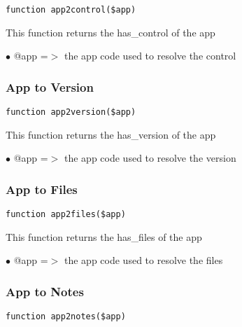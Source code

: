 \documentclass[a4paper]{article}
\begin{document}
\begin{lstlisting}
function app2control($app)
\end{lstlisting}

This function returns the has\_control of the app

\begin{compactitem}
\item[\color{myblue}$\bullet$] @app =$>$ the app code used to resolve the control
\end{compactitem}

\hypertarget{toc29}{}
\subsubsection{App to Version}

\begin{lstlisting}
function app2version($app)
\end{lstlisting}

This function returns the has\_version of the app

\begin{compactitem}
\item[\color{myblue}$\bullet$] @app =$>$ the app code used to resolve the version
\end{compactitem}

\hypertarget{toc30}{}
\subsubsection{App to Files}

\begin{lstlisting}
function app2files($app)
\end{lstlisting}

This function returns the has\_files of the app

\begin{compactitem}
\item[\color{myblue}$\bullet$] @app =$>$ the app code used to resolve the files
\end{compactitem}

\hypertarget{toc31}{}
\subsubsection{App to Notes}

\begin{lstlisting}
function app2notes($app)
\end{lstlisting}
\end{document}
